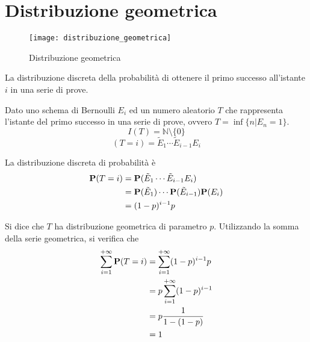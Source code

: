 
\section{Distribuzione geometrica} %
\begin{figure*}
  \texttt{[image: distribuzione\_geometrica]}
  \caption{Distribuzione geometrica}
\end{figure*}

\begin{definition}
  \label{def:distribuzione_geometrica}
  La distribuzione discreta della probabilità di ottenere il primo successo all'istante \( i \) in una serie di prove.
\end{definition}

Dato uno schema di Bernoulli \( E_i \) ed un numero aleatorio \( T \) che rappresenta l'istante del primo successo in una serie di prove, ovvero \( T = \inf\{ n | E_n = 1 \} \).
\[ I(T) = \mathbb{N} \setminus \{ 0 \} \]
\[ (T = i) = \tilde{E}_1 \cdots \tilde{E}_{i-1} E_i \]

La distribuzione discreta di probabilità è
\begin{align*}
  \mathbf{P}(T = i) &= \mathbf{P}(\tilde{E}_1 \cdots \tilde{E}_{i-1} E_i) \\
  &= \mathbf{P}(\tilde{E}_1) \cdots \mathbf{P}(\tilde{E}_{i-1}) \mathbf{P}(E_i) \\
  &= (1-p)^{i-1} p
\end{align*}

Si dice che \( T \) ha distribuzione geometrica di parametro \( p \).
Utilizzando la somma della serie geometrica, si verifica che
\begin{align*}
  \sum_{i=1}^{+ \infty} \mathbf{P}(T = i) &= \sum_{i=1}^{+ \infty} (1-p)^{i-1} p \\
  &= p \sum_{i=1}^{+ \infty} (1-p)^{i-1}  \\
  &= p \frac{1}{1-(1-p)} \\
  &= 1
\end{align*}



